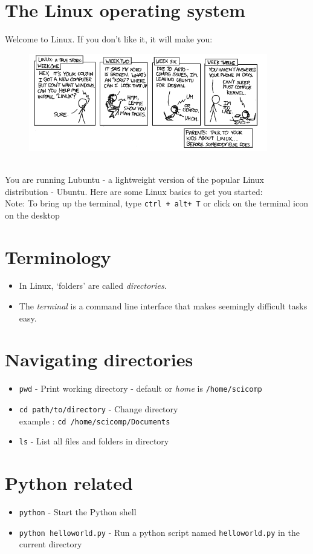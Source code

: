 \documentclass{article}
\begin{document}
\section*{The Linux operating system}
Welcome to Linux. If you don't like it, it will make you:\newline
\begin{figure}[h]
\includegraphics[height=120pt]{../pictures/xkcd_linux.png}
\end{figure}
\newline \\
You are running Lubuntu - a lightweight version of the popular Linux distribution -
Ubuntu. Here are some Linux basics to get you started:
\newline
\\ Note: To bring up the terminal, type \texttt{ctrl + alt+ T} or click on the
terminal icon on the desktop
\section*{Terminology}
\begin{itemize}
\item In Linux, `folders' are called \emph{directories}.
\item The \emph{terminal} is a command line interface that makes seemingly difficult
		tasks easy.
\end{itemize} 
\section*{Navigating directories}
\begin{itemize}
\item \texttt{pwd} - Print working directory - default or \emph{home} is \texttt{/home/scicomp}
\item \texttt{cd path/to/directory} - Change directory
\newline
\\ example : \texttt{cd /home/scicomp/Documents}
\item \texttt{ls} - List all files and folders in directory
\end{itemize}
\section*{Python related}
\begin{itemize}
\item \texttt{python} - Start the Python shell
\item \texttt{python helloworld.py} - Run a python script named \texttt{helloworld.py}
			in the current directory
\end{itemize}
\end{document}

